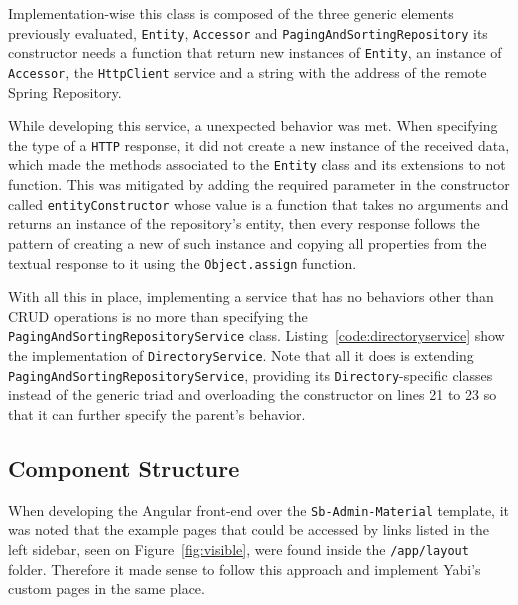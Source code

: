 Implementation-wise this class is composed of the three generic elements previously evaluated, \texttt{Entity}, \texttt{Accessor} and \texttt{PagingAndSortingRepository} its constructor needs a function that return new instances of \texttt{Entity}, an instance of \texttt{Accessor}, the \texttt{HttpClient} service and a string with the address of the remote Spring Repository.

While developing this service, a unexpected behavior was met. When specifying the type of a \texttt{HTTP} response, it did not create a new instance of the received data, which made the methods associated to the \texttt{Entity} class and its extensions to not function. This was mitigated by adding the required parameter in the constructor called \texttt{entityConstructor} whose value is a function that takes no arguments and returns an instance of the repository's entity, then every response follows the pattern of creating a new of such instance and copying all properties from the textual response to it using the \texttt{Object.assign} function.

With all this in place, implementing a service that has no behaviors other than \gls{CRUD} operations is no more than specifying the \texttt{PagingAndSortingRepositoryService} class. Listing~\ref{code:directoryservice} show the implementation of \texttt{DirectoryService}. Note that all it does is extending \texttt{PagingAndSortingRepositoryService}, providing its \texttt{Directory}-specific classes instead of the generic triad and overloading the constructor on lines 21 to 23 so that it can further specify the parent's behavior.



\subsection{Component Structure}\label{component:structure}
When developing the Angular front-end over the \texttt{Sb-Admin-Material} template, it was noted that the example pages that could be accessed by links listed in the left sidebar, seen on Figure~\ref{fig:visible}, were found inside the \texttt{/app/layout} folder. Therefore it made sense to follow this approach and implement \gls{Yabi}'s custom pages in the same place.

